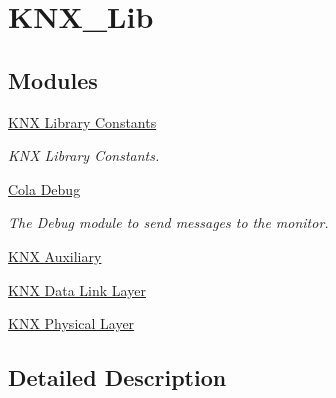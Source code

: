\hypertarget{group___k_n_x___lib}{}\section{K\+N\+X\+\_\+\+Lib}
\label{group___k_n_x___lib}
\subsection*{Modules}
\begin{DoxyCompactItemize}
\item 
\hyperlink{group___k_n_x___lib___constants}{K\+N\+X Library Constants}
\begin{DoxyCompactList}\small\item\em K\+NX Library Constants. \end{DoxyCompactList}\item 
\hyperlink{group___cola___debug}{Cola Debug}
\begin{DoxyCompactList}\small\item\em The Debug module to send messages to the monitor. \end{DoxyCompactList}\item 
\hyperlink{group___k_n_x___aux}{K\+N\+X Auxiliary}
\item 
\hyperlink{group___k_n_x___d_l}{K\+N\+X Data Link Layer}
\item 
\hyperlink{group___k_n_x___p_h}{K\+N\+X Physical Layer}
\end{DoxyCompactItemize}


\subsection{Detailed Description}
